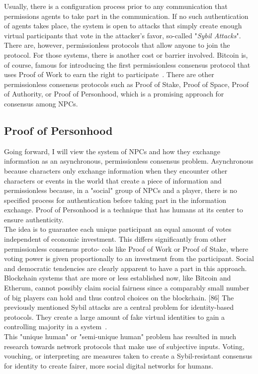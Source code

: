 Usually, there is a configuration process prior to any communication that permissions agents to take part in the communication. If no such authentication of agents takes place, the system is open to attacks that simply create enough virtual participants that vote in the attacker's favor, so-called "\textit{Sybil Attacks}". There are, however, permissionless protocols that allow anyone to join the protocol. For those systems, there is another cost or barrier involved. Bitcoin is, of course, famous for introducing the first permissionless consensus protocol that uses Proof of Work to earn the right to participate~\cite{Gervais2016}. There are other permissionless consensus protocols such as Proof of Stake, Proof of Space, Proof of Authority, or Proof of Personhood, which is a promising approach for consensus among NPCs.~\cite{Coulouris2001}
\subsection{Proof of Personhood}
Going forward, I will view the system of NPCs and how they exchange information as an asynchronous, permissionless consensus problem. Asynchronous because characters only exchange information when they encounter other characters or events in the world that create a piece of information and permissionless because, in a "social" group of NPCs and a player, there is no specified process for authentication before taking part in the information exchange. Proof of Personhood is a technique that has humans at its center to ensure authenticity.~\cite{Borge2017}\\
The idea is to guarantee each unique participant an equal amount of votes independent of economic investment. This differs significantly from other permissionless consensus proto- cols like Proof of Work or Proof of Stake, where voting power is given proportionally to an investment from the participant. Social and democratic tendencies are clearly apparent to have a part in this approach. Blockchain systems that are more or less established now, like Bitcoin and Etherum, cannot possibly claim social fairness since a comparably small number of big players can hold and thus control choices on the blockchain. [86] The previously mentioned Sybil attacks are a central problem for identity-based protocols. They create a large amount of fake virtual identities to gain a controlling majority in a system~\cite{Douceur2002}.\\
This "unique human" or "semi-unique human" problem has resulted in much research towards network protocols that make use of subjective inputs. Voting, vouching, or interpreting are measures taken to create a Sybil-resistant consensus for identity to create fairer, more social digital networks for humans.~\cite{Siddarth2020}\\

